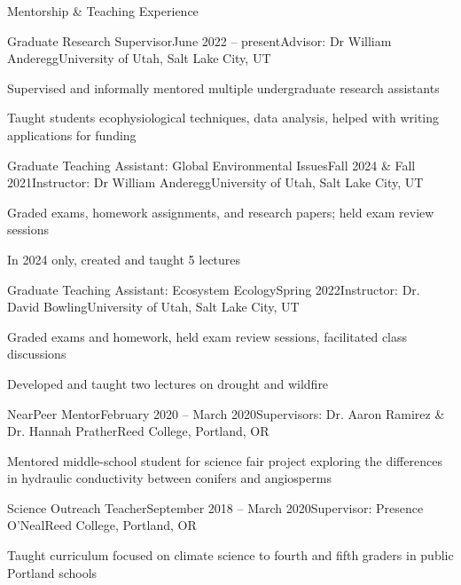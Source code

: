 \documentclass{resume} %
\begin{document}
\begin{rSection}{Mentorship \& Teaching Experience}


\begin{rSubsection}{Graduate Research Supervisor}{June 2022 -- present}{Advisor: Dr William Anderegg}{University of Utah, Salt Lake City, UT}
\item Supervised and informally mentored multiple undergraduate research assistants 
\item Taught students ecophysiological techniques, data analysis, helped with writing applications for funding
\end{rSubsection}


\begin{rSubsection}{Graduate Teaching Assistant: Global Environmental Issues}{Fall 2024 \& Fall 2021}{Instructor: Dr William Anderegg}{University of Utah, Salt Lake City, UT}
\item Graded exams, homework assignments, and research papers; held exam review sessions
\item In 2024 only, created and taught 5 lectures
\end{rSubsection}


\begin{rSubsection}{Graduate Teaching Assistant: Ecosystem Ecology}{Spring 2022}{Instructor: Dr. David Bowling}{University of Utah, Salt Lake City, UT}
\item Graded exams and homework, held exam review sessions, facilitated class discussions
\item Developed and taught two lectures on drought and wildfire
\end{rSubsection}



\begin{rSubsection}{NearPeer Mentor}{February 2020 -- March 2020}{Supervisors: Dr. Aaron Ramirez \& Dr. Hannah Prather}{Reed College, Portland, OR}
\item Mentored middle-school student for science fair project exploring the differences in hydraulic conductivity between conifers and angiosperms 
\end{rSubsection}


\begin{rSubsection}{Science Outreach Teacher}{September 2018 -- March 2020}{Supervisor: Presence O'Neal}{Reed College, Portland, OR}
\item Taught curriculum focused on climate science to fourth and fifth graders in public Portland schools
\end{rSubsection}


\end{rSection}
\end{document}
